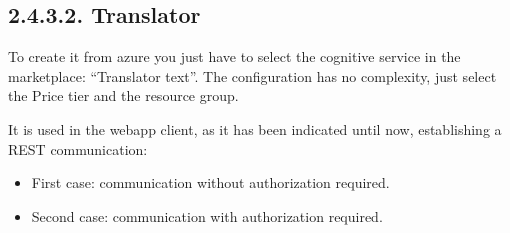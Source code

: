 \documentclass[letterpaper,10pt,english]{sphinxmanual}
\begin{document}
\subsection{2.4.3.2. Translator}
\label{\detokenize{pages/SW/Code:translator}}
To create it from azure you just have to select the cognitive service in the marketplace: “Translator text”.
The configuration has no complexity, just select the Price tier and the resource group.

It is used in the webapp client, as it has been indicated until now, establishing a REST communication:
\begin{itemize}
\item {} 
First case: communication without authorization required.

\end{itemize}

\begin{sphinxVerbatim}[commandchars=\\\{\}]
  
         
    	          
       
           
\end{sphinxVerbatim}
\begin{itemize}
\item {} 
Second case: communication with authorization required.

\end{itemize}
\end{document}
